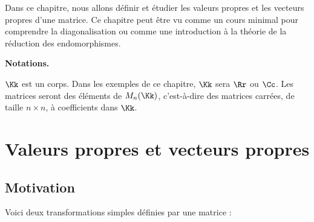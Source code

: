 \documentclass[11pt, class=report,crop=false]{standalone}
\begin{document}


Dans ce chapitre, nous allons définir et étudier les valeurs propres et 
les vecteurs propres d'une matrice.
Ce chapitre peut être vu comme un cours minimal pour comprendre la diagonalisation ou comme une 
introduction à la théorie de la réduction des endomorphismes.

\bigskip

\textbf{Notations.}


$\Kk$ est un corps. Dans les exemples de ce chapitre, $\Kk$ sera $\Rr$ ou $\Cc$.
Les matrices seront des éléments de $M_n(\Kk)$, c'est-à-dire des matrices carrées, de taille $n\times n$, à coefficients dans $\Kk$. 





\section{Valeurs propres et vecteurs propres}


\subsection{Motivation}

Voici deux transformations simples définies par une matrice :
\end{document}
